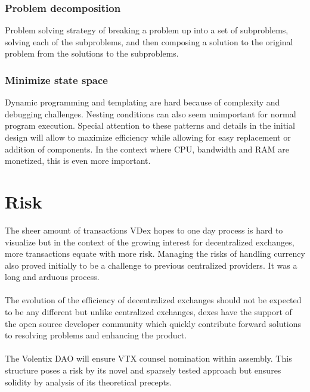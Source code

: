 \documentclass[]{article}
\begin{document}
	\subsubsection{Problem decomposition}
	Problem solving strategy of breaking a problem up into a set of subproblems, solving each of the subproblems, 
	and then composing a solution to the original problem from the solutions to the subproblems.
	\subsubsection{Minimize state space}
	Dynamic programming and templating are hard because of complexity and debugging challenges. 
	Nesting conditions can also seem unimportant for normal program execution.
	Special attention to these patterns and details in the initial design will allow to maximize efficiency while allowing for easy replacement or addition of components.   
	In the context where CPU, bandwidth and RAM are monetized, this is even more important. 
	
\section{Risk}
	The sheer amount of transactions VDex hopes to one day process is hard to visualize 
	but in the context of the growing interest for decentralized exchanges, more transactions equate with more risk. 
	Managing the risks of handling currency also proved initially to be a challenge to previous centralized providers. 
	It was a long and arduous process.\\
	\paragraph{} The evolution of the efficiency of decentralized exchanges should not be expected to be any different but unlike centralized exchanges, 
	dexes have the support of the open source developer community which quickly contribute forward solutions to resolving problems and enhancing the product. \\
	\paragraph{}  The Volentix DAO will ensure VTX counsel nomination within assembly. 
	This structure poses a risk by its novel and sparsely tested approach but ensures solidity by analysis of its theoretical precepts.
\paragraph{}
\end{document}
